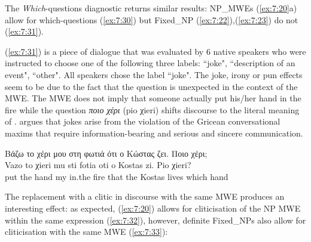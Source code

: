 \documentclass[output=paper]{langsci/langscibook}
\begin{document}
 

\z

The {\itshape Which}-questions diagnostic returns similar results: NP\_MWEs  (\ref{ex:7:20}a) allow for which-questions (\ref{ex:7:30}) but  Fixed\_NP  (\ref{ex:7:22}),(\ref{ex:7:23}) do not (\ref{ex:7:31}).

\z


(\ref{ex:7:31}) is a piece of dialogue that was evaluated by  6 native speakers who were instructed to choose one of the following three labels: ``joke", ``description of an event", ``other". All speakers chose the label ``joke". The joke, irony or pun effects seem to be due to the fact that the question  is unexpected in the context of the MWE. The MWE does not imply that someone actually put his/her hand in the fire while the question \textit{ποιο χέρι} (pio χieri)  shifts discourse to the literal meaning of . \citet{raskin1985} argues that jokes arise from the violation of the Gricean conversational maxims that require information-bearing and serious and sincere communication. 

\begin{exe}%
\ex \label{ex:7:31}
\glll    Βάζω το χέρι μου στη φωτιά ότι ο Κώστας ζει. Ποιο χέρι;\\
Vazo to χieri mu sti fotia oti o Kostas zi. Pio χieri? \\
          put the hand my in.the fire that the Kostas lives which hand\\ 
\end{exe}


The replacement with a clitic in discourse with the same MWE produces an interesting effect: as expected, (\ref{ex:7:20}) allows for cliticisation of the NP MWE within the same expression (\ref{ex:7:32}), however, definite Fixed\_NPs also allow for cliticisation with the same MWE (\ref{ex:7:33}):
\end{document}
